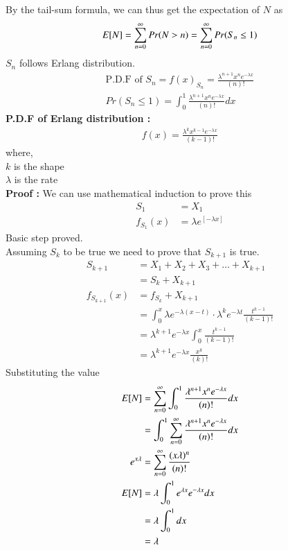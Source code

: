 \documentclass[journal,12pt,twocolumn]{IEEEtran}
\begin{document}
By the tail-sum formula, we can thus get the expectation of $N$ as\\
\begin{align}
    E[ N ] = \sum ^\infty _{n = 0} Pr(N > n) = \sum ^\infty _{n = 0} Pr(S_n \leq 1)
\end{align}
$S_n$ follows Erlang distribution.\\
\begin{align}
    \text{P.D.F of }S_n = f(x)_{S_n} = \frac{\lambda^{n+1} x^{n}e^{-\lambda x}}{(n)!}\\
    Pr(S_n \leq 1) = \int _0 ^1 \frac{\lambda^{n+1} x^{n}e^{-\lambda x}}{(n)!} dx
\end{align}
\textbf{P.D.F of Erlang distribution : }\\
\begin{align}
    f(x) = \frac{\lambda^{k} x^{k-1}e^{-\lambda x}}{(k-1)!}
\end{align}
where,\\
$k$ is the shape\\
$\lambda$ is the rate\\
\textbf{Proof : }We can use mathematical induction to prove this\\
\begin{align}
  S_1 &= X_1\\
  f_{S_1}(x) &= \lambda e^{[-\lambda x]}
\end{align}
Basic step proved.\\
Assuming $S_k$ to be true we need to prove that $S_{k+1}$ is true.\\
\begin{align}
    S_{k+1} &= X_1 + X_2 + X_3 + \dots + X_{k+1}\\
    &= S_k + X_{k+1}\\
    f_{S_{k+1}}(x) &= f_{S_k} + X_{k+1}\\
    &= \int _0 ^x \lambda e^{-\lambda(x-t)} \cdot \lambda^k e^{-\lambda t} \frac{t^{k-1}}{(k-1)!}\\
    &= \lambda^{k+1} e^{-\lambda x} \int _0 ^x \frac{t^{k-1}}{(k-1)!}\\
    &= \lambda^{k+1} e^{-\lambda x} \frac{x^k}{(k)!}
\end{align}
Substituting the value\\
\begin{align}
    E[ N ] &= \sum _{n = 0} ^\infty \int _0 ^1  \frac{\lambda^{n+1} x^{n}e^{-\lambda x}}{(n)!} dx\\
    &= \int _0 ^1 \sum _{n = 0} ^\infty \frac{\lambda^{n+1} x^{n}e^{-\lambda x}}{(n)!} dx\\
    e^{x\lambda} &= \sum _{n = 0} ^ \infty\frac{(x\lambda)^n}{(n)!}\\
    E[ N ] &=\lambda  \int _0 ^1 e^{\lambda x} e^{-\lambda x} dx\\
    &= \lambda \int _0 ^1 dx\\
    &= \lambda
\end{align}
\end{document}
